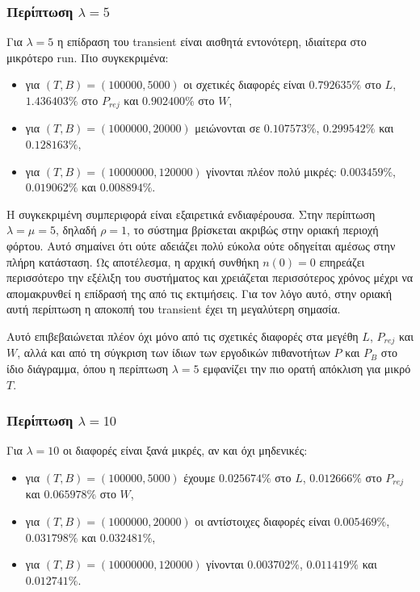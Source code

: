 \documentclass{article}
\begin{document}
\subsubsection*{Περίπτωση $\lambda=5$}

Για $\lambda=5$ η επίδραση του transient είναι αισθητά εντονότερη, ιδιαίτερα στο μικρότερο run. Πιο συγκεκριμένα:
\begin{itemize}
    \item για $(T,B)=(100000,5000)$ οι σχετικές διαφορές είναι $0.792635\%$ στο $L$, $1.436403\%$ στο $P_{rej}$ και $0.902400\%$ στο $W$,
    \item για $(T,B)=(1000000,20000)$ μειώνονται σε $0.107573\%$, $0.299542\%$ και $0.128163\%$,
    \item για $(T,B)=(10000000,120000)$ γίνονται πλέον πολύ μικρές: $0.003459\%$, $0.019062\%$ και $0.008894\%$.
\end{itemize}

Η συγκεκριμένη συμπεριφορά είναι εξαιρετικά ενδιαφέρουσα. Στην περίπτωση $\lambda=\mu=5$, δηλαδή $\rho=1$, το σύστημα βρίσκεται ακριβώς στην οριακή περιοχή φόρτου. Αυτό σημαίνει ότι ούτε αδειάζει πολύ εύκολα ούτε οδηγείται αμέσως στην πλήρη κατάσταση. Ως αποτέλεσμα, η αρχική συνθήκη $n(0)=0$ επηρεάζει περισσότερο την εξέλιξη του συστήματος και χρειάζεται περισσότερος χρόνος μέχρι να απομακρυνθεί η επίδρασή της από τις εκτιμήσεις. Για τον λόγο αυτό, στην οριακή αυτή περίπτωση η αποκοπή του transient έχει τη μεγαλύτερη σημασία.

Αυτό επιβεβαιώνεται πλέον όχι μόνο από τις σχετικές διαφορές στα μεγέθη $L$, $P_{rej}$ και $W$, αλλά και από τη σύγκριση των ίδιων των εργοδικών πιθανοτήτων $P$ και $P_B$ στο ίδιο διάγραμμα, όπου η περίπτωση $\lambda=5$ εμφανίζει την πιο ορατή απόκλιση για μικρό $T$.

\subsubsection*{Περίπτωση $\lambda=10$}

Για $\lambda=10$ οι διαφορές είναι ξανά μικρές, αν και όχι μηδενικές:
\begin{itemize}
    \item για $(T,B)=(100000,5000)$ έχουμε $0.025674\%$ στο $L$, $0.012666\%$ στο $P_{rej}$ και $0.065978\%$ στο $W$,
    \item για $(T,B)=(1000000,20000)$ οι αντίστοιχες διαφορές είναι $0.005469\%$, $0.031798\%$ και $0.032481\%$,
    \item για $(T,B)=(10000000,120000)$ γίνονται $0.003702\%$, $0.011419\%$ και $0.012741\%$.
\end{itemize}
\end{document}
